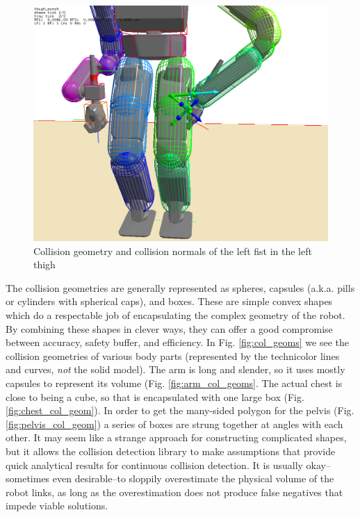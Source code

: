 \documentclass[letterpaper, 10 pt, conference]{ieeeconf}  %
\begin{document}
\begin{figure}[h]
    \includegraphics[width=\columnwidth]{pictures/thigh_punch_collision}
    \caption{Collision geometry and collision normals of the left fist in the left thigh}
    \label{fig:thigh_punch_collision}
\end{figure}

The collision geometries are generally represented as spheres, capsules (a.k.a. pills or cylinders with spherical caps), and boxes. These are simple convex shapes which do a respectable job of encapsulating the complex geometry of the robot. By combining these shapes in clever ways, they can offer a good compromise between accuracy, safety buffer, and efficiency. In Fig. \ref{fig:col_geoms} we see the collision geometries of various body parts (represented by the technicolor lines and curves, \emph{not} the solid model). The arm is long and slender, so it uses mostly capsules to represent its volume (Fig. \ref{fig:arm_col_geoms}. The actual chest is close to being a cube, so that is encapsulated with one large box (Fig. \ref{fig:chest_col_geom}). In order to get the many-sided polygon for the pelvis (Fig. \ref{fig:pelvis_col_geom}) a series of boxes are strung together at angles with each other. It may seem like a strange approach for constructing complicated shapes, but it allows the collision detection library to make assumptions that provide quick analytical results for continuous collision detection. It is usually okay--sometimes even desirable--to sloppily overestimate the physical volume of the robot links, as long as the overestimation does not produce false negatives that impede viable solutions. 
\end{document}
